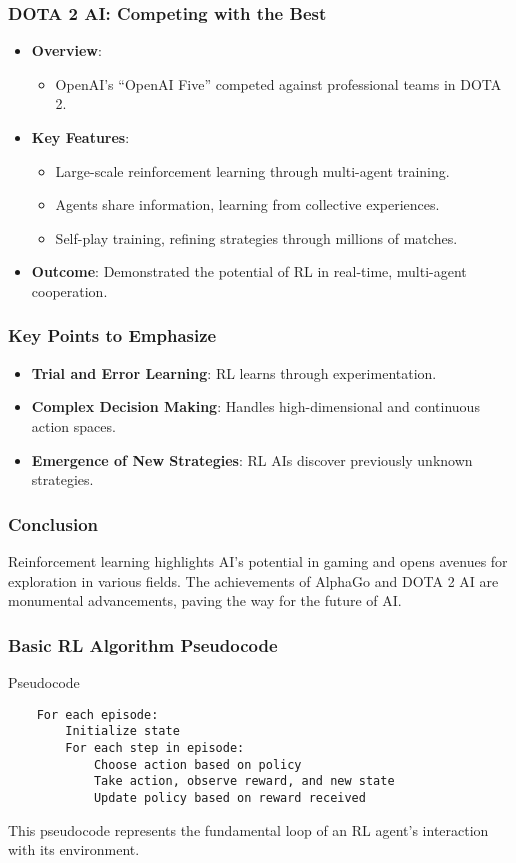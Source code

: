 \documentclass[aspectratio=169]{beamer}
\begin{document}
\begin{frame}[fragile]
    \frametitle{DOTA 2 AI: Competing with the Best}
    \begin{itemize}
        \item \textbf{Overview}:
        \begin{itemize}
            \item OpenAI's “OpenAI Five” competed against professional teams in DOTA 2.
        \end{itemize}
        \item \textbf{Key Features}:
        \begin{itemize}
            \item Large-scale reinforcement learning through multi-agent training.
            \item Agents share information, learning from collective experiences.
            \item Self-play training, refining strategies through millions of matches.
        \end{itemize}
        \item \textbf{Outcome}: Demonstrated the potential of RL in real-time, multi-agent cooperation.
    \end{itemize}
\end{frame}

\begin{frame}[fragile]
    \frametitle{Key Points to Emphasize}
    \begin{itemize}
        \item \textbf{Trial and Error Learning}: RL learns through experimentation.
        \item \textbf{Complex Decision Making}: Handles high-dimensional and continuous action spaces.
        \item \textbf{Emergence of New Strategies}: RL AIs discover previously unknown strategies.
    \end{itemize}
\end{frame}

\begin{frame}[fragile]
    \frametitle{Conclusion}
    Reinforcement learning highlights AI's potential in gaming and opens avenues for exploration in various fields. 
    The achievements of AlphaGo and DOTA 2 AI are monumental advancements, paving the way for the future of AI.
\end{frame}

\begin{frame}[fragile]
    \frametitle{Basic RL Algorithm Pseudocode}
    \begin{block}{Pseudocode}
    \begin{lstlisting}
    For each episode:
        Initialize state
        For each step in episode:
            Choose action based on policy
            Take action, observe reward, and new state
            Update policy based on reward received
    \end{lstlisting}
    \end{block}
    This pseudocode represents the fundamental loop of an RL agent's interaction with its environment.
\end{frame}
\end{document}
